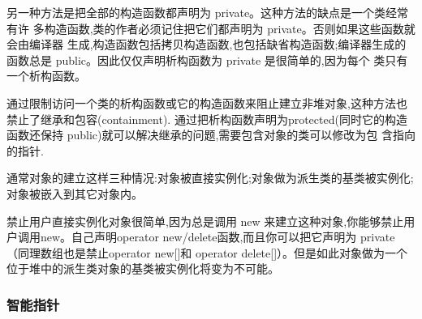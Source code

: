 另一种方法是把全部的构造函数都声明为 private。这种方法的缺点是一个类经常有许 多构造函数,类的作者必须记住把它们都声明为 private。否则如果这些函数就会由编译器 生成,构造函数包括拷贝构造函数,也包括缺省构造函数;编译器生成的函数总是 public。因此仅仅声明析构函数为 private 是很简单的,因为每个 类只有一个析构函数。

通过限制访问一个类的析构函数或它的构造函数来阻止建立非堆对象,这种方法也禁止了继承和包容(containment). 通过把析构函数声明为protected(同时它的构造函数还保持 public)就可以解决继承的问题,需要包含对象的类可以修改为包
含指向的指针.
\item[禁止堆对象]通常对象的建立这样三种情况:对象被直接实例化;对象做为派生类的基类被实例化; 对象被嵌入到其它对象内。

禁止用户直接实例化对象很简单,因为总是调用 new 来建立这种对象,你能够禁止用户调用new。自己声明operator new/delete函数,而且你可以把它声明为 private（同理数组也是禁止operator new[]和 operator delete[]）。但是如此对象做为一个位于堆中的派生类对象的基类被实例化将变为不可能。

\myenddot

\subsubsection{智能指针}

